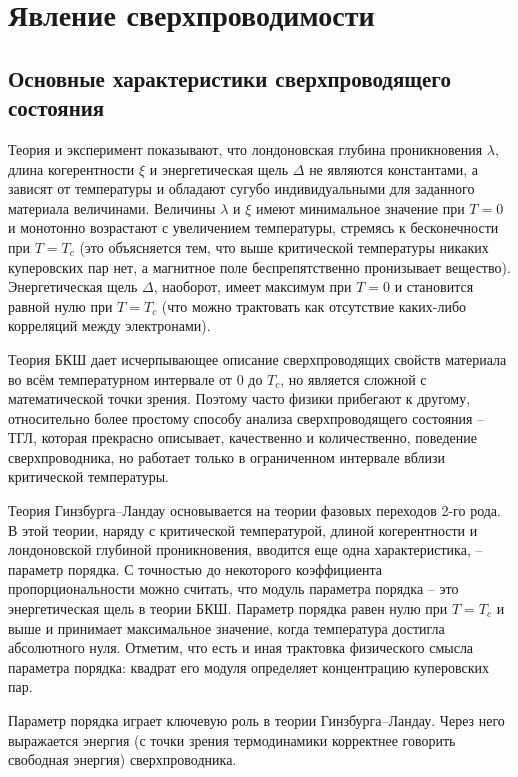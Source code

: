 \chapter{Явление сверхпроводимости}

\section{Основные характеристики сверхпроводящего состояния}

Теория и эксперимент показывают, что лондоновская глубина проникновения 
\( \lambda \), длина когерентности \( \xi \) и энергетическая щель 
\( \Delta \) не являются константами, а зависят от температуры и обладают 
сугубо индивидуальными для заданного материала величинами. Величины 
\( \lambda \) и \( \xi \) имеют минимальное значение при \( T = 0 \) и 
монотонно возрастают с увеличением температуры, стремясь к бесконечности при 
\( T = T_c \) (это объясняется тем, что выше критической температуры никаких 
куперовских пар нет, а магнитное поле беспрепятственно пронизывает вещество). 
Энергетическая щель \( \Delta \), наоборот, имеет максимум при \( T = 0 \) и 
становится равной нулю при \( T = T_c \) (что можно трактовать как отсутствие 
каких-либо корреляций между электронами).

Теория БКШ дает исчерпывающее описание сверхпроводящих свойств материала во 
всём температурном интервале от \( 0 \) до \( T_c \), но является сложной с 
математической точки зрения. Поэтому часто физики прибегают к другому, 
относительно более простому способу анализа сверхпроводящего состояния -- ТГЛ, 
которая прекрасно описывает, качественно и количественно, поведение 
сверхпроводника, но работает только в ограниченном интервале вблизи 
критической температуры.

Теория Гинзбурга–Ландау основывается на теории фазовых переходов 2-го рода. В 
этой теории, наряду с критической температурой, длиной когерентности и 
лондоновской глубиной проникновения, вводится еще одна характеристика, -- 
параметр порядка. С точностью до некоторого коэффициента пропорциональности 
можно считать, что модуль параметра порядка -- это энергетическая щель в 
теории БКШ. Параметр порядка равен нулю при \( T = T_c \) и выше и принимает 
максимальное значение, когда температура достигла абсолютного нуля. Отметим, 
что есть и иная трактовка физического смысла параметра порядка: квадрат его 
модуля определяет концентрацию куперовских пар.

Параметр порядка играет ключевую роль в теории Гинзбурга–Ландау. Через него 
выражается энергия (с точки зрения термодинамики корректнее говорить 
свободная энергия) сверхпроводника.\cite{bib:net}

